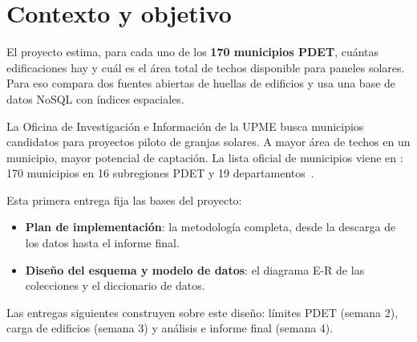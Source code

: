 \section{Contexto y objetivo}
\label{sec:contexto}

El proyecto estima, para cada uno de los \textbf{170 municipios PDET}, cuántas
edificaciones hay y cuál es el área total de techos disponible para paneles
solares. Para eso compara dos fuentes abiertas de huellas de edificios y usa
una base de datos NoSQL con índices espaciales.

La Oficina de Investigación e Información de la UPME busca municipios
candidatos para proyectos piloto de granjas solares. A mayor
área de techos en un municipio, mayor potencial de captación. La lista oficial
de municipios viene en : 170 municipios en 16
subregiones PDET y 19 departamentos~\cite{pdet}.

Esta primera entrega fija las bases del proyecto:

\begin{itemize}
  \item \textbf{Plan de implementación}: la metodología completa, desde la
        descarga de los datos hasta el informe final.
  \item \textbf{Diseño del esquema y modelo de datos}: el diagrama E-R de las
        colecciones y el diccionario de datos.
\end{itemize}

Las entregas siguientes construyen sobre este diseño: límites PDET (semana 2),
carga de edificios (semana 3) y análisis e informe final (semana 4).
